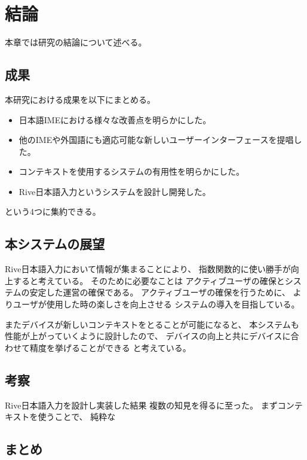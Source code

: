 \chapter{結論}
\label{chap:conclusion}
本章では研究の結論について述べる。

\newpage
\section{成果}
本研究における成果を以下にまとめる。
\begin{itemize}
  \item 日本語IMEにおける様々な改善点を明らかにした。
  \item 他のIMEや外国語にも適応可能な新しいユーザーインターフェースを提唱した。
  \item コンテキストを使用するシステムの有用性を明らかにした。
  \item Rive日本語入力というシステムを設計し開発した。
\end{itemize}
という4つに集約できる。

\section{本システムの展望}
Rive日本語入力において情報が集まることにより、
指数関数的に使い勝手が向上すると考えている。
そのために必要なことは
アクティブユーザの確保とシステムの安定した運営の確保である。
アクティブユーザの確保を行うために、
よりユーザが使用した時の楽しさを向上させる
システムの導入を目指している。

またデバイスが新しいコンテキストをとることが可能になると、
本システムも性能が上がっていくように設計したので、
デバイスの向上と共にデバイスに合わせて精度を挙げることができる
と考えている。

\section{考察}
Rive日本語入力を設計し実装した結果
複数の知見を得るに至った。
まずコンテキストを使うことで、
純粋な

\section{まとめ}

